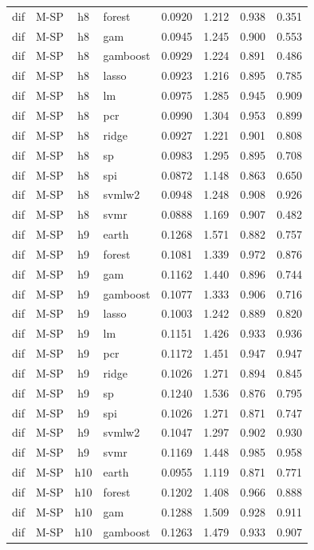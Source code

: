 \begin{ThreePartTable}
\begin{longtable}[t]{llclcccc}
dif & M-SP & h8 & forest & 0.0920 & 1.212 & 0.938 & 0.351\\
dif & M-SP & h8 & gam & 0.0945 & 1.245 & 0.900 & 0.553\\
dif & M-SP & h8 & gamboost & 0.0929 & 1.224 & 0.891 & 0.486\\
dif & M-SP & h8 & lasso & 0.0923 & 1.216 & 0.895 & 0.785\\
dif & M-SP & h8 & lm & 0.0975 & 1.285 & 0.945 & 0.909\\
dif & M-SP & h8 & pcr & 0.0990 & 1.304 & 0.953 & 0.899\\
dif & M-SP & h8 & ridge & 0.0927 & 1.221 & 0.901 & 0.808\\
dif & M-SP & h8 & sp & 0.0983 & 1.295 & 0.895 & 0.708\\
dif & M-SP & h8 & spi & 0.0872 & 1.148 & 0.863 & 0.650\\
dif & M-SP & h8 & svmlw2 & 0.0948 & 1.248 & 0.908 & 0.926\\
dif & M-SP & h8 & svmr & 0.0888 & 1.169 & 0.907 & 0.482\\
\addlinespace
dif & M-SP & h9 & earth & 0.1268 & 1.571 & 0.882 & 0.757\\
dif & M-SP & h9 & forest & 0.1081 & 1.339 & 0.972 & 0.876\\
dif & M-SP & h9 & gam & 0.1162 & 1.440 & 0.896 & 0.744\\
dif & M-SP & h9 & gamboost & 0.1077 & 1.333 & 0.906 & 0.716\\
dif & M-SP & h9 & lasso & 0.1003 & 1.242 & 0.889 & 0.820\\
dif & M-SP & h9 & lm & 0.1151 & 1.426 & 0.933 & 0.936\\
dif & M-SP & h9 & pcr & 0.1172 & 1.451 & 0.947 & 0.947\\
dif & M-SP & h9 & ridge & 0.1026 & 1.271 & 0.894 & 0.845\\
dif & M-SP & h9 & sp & 0.1240 & 1.536 & 0.876 & 0.795\\
dif & M-SP & h9 & spi & 0.1026 & 1.271 & 0.871 & 0.747\\
dif & M-SP & h9 & svmlw2 & 0.1047 & 1.297 & 0.902 & 0.930\\
dif & M-SP & h9 & svmr & 0.1169 & 1.448 & 0.985 & 0.958\\
\addlinespace
dif & M-SP & h10 & earth & 0.0955 & 1.119 & 0.871 & 0.771\\
dif & M-SP & h10 & forest & 0.1202 & 1.408 & 0.966 & 0.888\\
dif & M-SP & h10 & gam & 0.1288 & 1.509 & 0.928 & 0.911\\
dif & M-SP & h10 & gamboost & 0.1263 & 1.479 & 0.933 & 0.907\\

\end{longtable}
\end{ThreePartTable}
